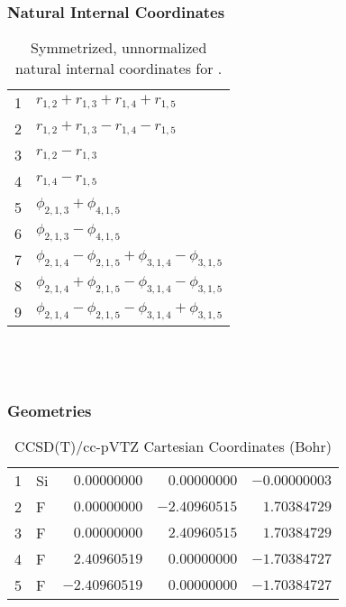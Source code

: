 \documentclass[10pt,oneside]{article}
\begin{document}
\subsubsection*{Natural Internal Coordinates}
\begin{table}[h!]
\centering
\caption{Symmetrized, unnormalized natural internal coordinates for .}
\small
\begin{tabular}{ll}
  1   & $r_{1,2} + r_{1,3} + r_{1,4} + r_{1,5}$ \\
  2   & $r_{1,2} + r_{1,3} - r_{1,4} - r_{1,5}$ \\
  3   & $r_{1,2} - r_{1,3}$ \\
  4   & $r_{1,4} - r_{1,5}$ \\
  5   & $\phi_{2,1,3} + \phi_{4,1,5}$ \\
  6   & $\phi_{2,1,3} - \phi_{4,1,5}$ \\
  7   & $\phi_{2,1,4} - \phi_{2,1,5} + \phi_{3,1,4} - \phi_{3,1,5}$ \\
  8   & $\phi_{2,1,4} + \phi_{2,1,5} - \phi_{3,1,4} - \phi_{3,1,5}$ \\
  9   & $\phi_{2,1,4} - \phi_{2,1,5} - \phi_{3,1,4} + \phi_{3,1,5}$ \\
\end{tabular}
\end{table}

\clearpage

\subsection{\ \ \ }

\subsubsection*{Geometries}
\begin{table}[h!]
\centering
\caption{CCSD(T)/cc-pVTZ Cartesian Coordinates (Bohr)}
\begin{tabular}{llrrr}
1  & Si & $ 0.00000000$ & $ 0.00000000$ & $-0.00000003$ \\
2  & F  & $ 0.00000000$ & $-2.40960515$ & $ 1.70384729$ \\
3  & F  & $ 0.00000000$ & $ 2.40960515$ & $ 1.70384729$ \\
4  & F  & $ 2.40960519$ & $ 0.00000000$ & $-1.70384727$ \\
5  & F  & $-2.40960519$ & $ 0.00000000$ & $-1.70384727$ \\
\end{tabular}
\end{table}
\end{document}
